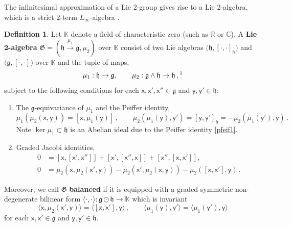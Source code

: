 \documentclass[11pt]{amsart}
\newcommand{\R}{{\mathbb R}}
\newcommand{\C}{{\mathbb C}}
\newcommand{\fg}{\mathfrak{g}}
\newcommand{\fh}{\mathfrak{h}}
\newcommand{\fG}{\mathfrak{G}}
\newcommand{\sfx}{\mathsf{x}}
\newcommand{\sfy}{\mathsf{y}}
\numberwithin{equation}{section}
\numberwithin{figure}{section}
\numberwithin{table}{section}
\theoremstyle{thm}
\numberwithin{equation}{subsection}
\theoremstyle{definition}
\newtheorem{dfn}[theorem]{Definition}
\theoremstyle{rem}
\begin{document}
The infinitesimal approximation of a Lie 2-group gives rise to a Lie 2-algebra, which is a strict 2-term $L_\infty$-algebra \cite{Baez:2003fs}. 
\begin{dfn}\label{lie2alg}
Let $\mathbb{K}$ denote a field of characteristic zero (such as $\R$ or $\C$). A {\bf Lie 2-algebra} $\fG=(\fh\xrightarrow{\mu_1}\fg,\mu_2)$ over $\mathbb{K}$ consist of two Lie algebras $\big(\fh,[\cdot,\cdot]_\fh\big)$ and $\big(\fg,[\cdot,\cdot]\big)$ over $\mathbb{K}$ and the tuple of maps,
\begin{equation*}
    \mu_1: \fh\rightarrow\fg,\qquad \mu_2: \fg\wedge\fh \rightarrow \fh\, ,\footnotemark
\end{equation*}
 subject to the following conditions for each $\sfx, \sfx',\sfx'' \in\fg$ and $\sfy,\sfy'\in\fh$:
\begin{enumerate}
    \item The $\fg$-equivariance of $\mu_1$ and the Peiffer identity,
    \begin{equation}
        \mu_1(\mu_2(\sfx,\sfy))=[\sfx,\mu_1(\sfy)]\,,\qquad \mu_2(\mu_1(\sfy),\sfy') =  [\sfy,\sfy']_\fh =- \mu_2(\mu_1(\sfy'),\sfy)\,.\label{pfeif1}
\end{equation}
\noindent Note $\operatorname{ker}\mu_1\subset \fh$ is an Abelian ideal due to the Peiffer identity \eqref{pfeif1}.

\item Graded Jacobi identities,
\begin{align}
\label{ec:gradjacobid}
        0&=[\sfx,[\sfx',\sfx'']]+[\sfx',[\sfx'',\sfx]]+[\sfx'',[\sfx,\sfx']], \\
        0&= \mu_2(\sfx,\mu_2(\sfx',\sfy)) - \mu_2(\sfx',\mu_2(\sfx,\sfy)) - \mu_2([\sfx,\sfx'],\sfy)\,.
    \end{align}
\end{enumerate}
Moreover, we call $\fG$ {\bf balanced} \cite{Zucchini:2021bnn} if it is equipped with a graded symmetric non-degenerate bilinear form $\langle \cdot,\cdot\rangle: \fg\odot\fh \rightarrow \mathbb{K}$ which is invariant
\begin{equation}
    \langle \sfx,\mu_2(\sfx',\sfy)\rangle = \langle [\sfx,\sfx'],\sfy\rangle\,,\qquad \langle \mu_1(\sfy),\sfy'\rangle = \langle \mu_1(\sfy'),\sfy\rangle\label{inv}
\end{equation}
for each $\sfx,\sfx'\in\fg$ and $\sfy,\sfy'\in \fh$.
\end{dfn}
\end{document}
